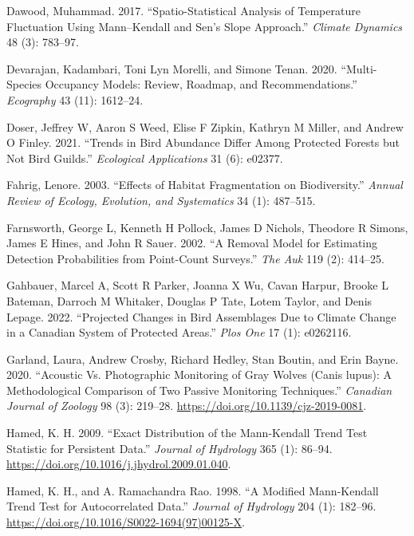 \documentclass[
  letterpaper,
  DIV=11,
  numbers=noendperiod]{scrartcl}
\newlength{\cslhangindent}
\newenvironment{CSLReferences}[2] %
 {\begin{list}{}{%
  \setlength{\itemindent}{0pt}
  \setlength{\leftmargin}{0pt}
  \setlength{\parsep}{0pt}
  \ifodd #1
   \setlength{\leftmargin}{\cslhangindent}
   \setlength{\itemindent}{-1\cslhangindent}
  \fi
  \setlength{\itemsep}{#2\baselineskip}}}
 {\end{list}}
\begin{document}
\begin{CSLReferences}{1}{0}
Dawood, Muhammad. 2017. {``Spatio-Statistical Analysis of Temperature
Fluctuation Using Mann--Kendall and Sen's Slope Approach.''}
\emph{Climate Dynamics} 48 (3): 783--97.

Devarajan, Kadambari, Toni Lyn Morelli, and Simone Tenan. 2020.
{``Multi-Species Occupancy Models: Review, Roadmap, and
Recommendations.''} \emph{Ecography} 43 (11): 1612--24.

Doser, Jeffrey W, Aaron S Weed, Elise F Zipkin, Kathryn M Miller, and
Andrew O Finley. 2021. {``Trends in Bird Abundance Differ Among
Protected Forests but Not Bird Guilds.''} \emph{Ecological Applications}
31 (6): e02377.

Fahrig, Lenore. 2003. {``Effects of Habitat Fragmentation on
Biodiversity.''} \emph{Annual Review of Ecology, Evolution, and
Systematics} 34 (1): 487--515.

Farnsworth, George L, Kenneth H Pollock, James D Nichols, Theodore R
Simons, James E Hines, and John R Sauer. 2002. {``A Removal Model for
Estimating Detection Probabilities from Point-Count Surveys.''}
\emph{The Auk} 119 (2): 414--25.

Gahbauer, Marcel A, Scott R Parker, Joanna X Wu, Cavan Harpur, Brooke L
Bateman, Darroch M Whitaker, Douglas P Tate, Lotem Taylor, and Denis
Lepage. 2022. {``Projected Changes in Bird Assemblages Due to Climate
Change in a Canadian System of Protected Areas.''} \emph{Plos One} 17
(1): e0262116.

Garland, Laura, Andrew Crosby, Richard Hedley, Stan Boutin, and Erin
Bayne. 2020. {``Acoustic Vs. Photographic Monitoring of Gray Wolves
({Canis lupus}): A Methodological Comparison of Two Passive Monitoring
Techniques.''} \emph{Canadian Journal of Zoology} 98 (3): 219--28.
\url{https://doi.org/10.1139/cjz-2019-0081}.

Hamed, K. H. 2009. {``Exact Distribution of the Mann-Kendall Trend Test
Statistic for Persistent Data.''} \emph{Journal of Hydrology} 365 (1):
86--94. \url{https://doi.org/10.1016/j.jhydrol.2009.01.040}.

Hamed, K. H., and A. Ramachandra Rao. 1998. {``A Modified Mann-Kendall
Trend Test for Autocorrelated Data.''} \emph{Journal of Hydrology} 204
(1): 182--96. \url{https://doi.org/10.1016/S0022-1694(97)00125-X}.


\end{CSLReferences}
\end{document}
